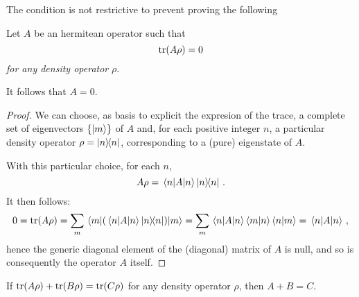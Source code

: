 The condition is not restrictive to prevent proving the following
\begin{proposition}
  Let $A$ be an hermitean operator such that
  $$
    \tr(A\rho) = 0 
  $$
  \emph{for any density operator} $\rho$.

  It follows that $A = 0$.

  \begin{proof}
    We can choose,
    as basis to explicit the expresion of the trace,
    a complete set of eigenvectors $\{\ket{m}\}$ of $A$ and,
    for each positive integer $n$,
    a particular density operator $\rho = \ketbra{n}$,
    corresponding to a (pure) eigenstate of $A$.

    With this particular choice,
    for each $n$,
    $$
      A\rho = \mel{n}{A}{n}\ketbra{n}\,.
    $$
    It then follows:
    $$
      0 = \tr(A\rho) = \sum_{m}\mel{m}{ ( \mel{n}{A}{n}\ketbra{n} ) }{m}
        = \sum_{m} \mel{n}{A}{n} \braket{m}{n} \braket{n}{m}
        = \mel{n}{A}{n}\,,
    $$
    hence the generic diagonal element of the (diagonal) matrix of $A$ is null,
    and so is consequently the operator $A$ itself.
  \end{proof}
\end{proposition}

\begin{corollary}
If $\tr(A\rho) + \tr(B\rho) = \tr(C\rho)$ for any density operator $\rho$,
then $A + B = C$.
\end{corollary}
